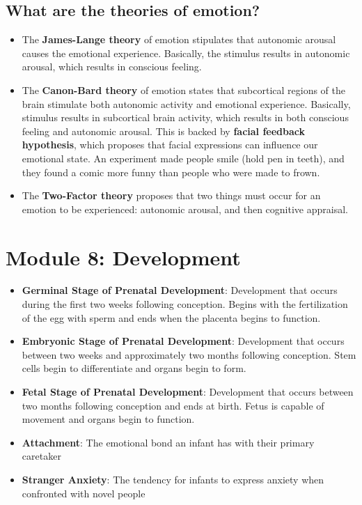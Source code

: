 \documentclass[10pt,letter]{article}
\theoremstyle{plain}
\theoremstyle{definition}
\begin{document}
\subsection*{What are the theories of emotion?}
\begin{itemize}
    \item The \textbf{James-Lange theory} of emotion stipulates that autonomic arousal causes the emotional experience. Basically, the stimulus results in autonomic arousal, which results in conscious feeling.
    \item The \textbf{Canon-Bard theory} of emotion states that subcortical regions of the brain stimulate both autonomic activity and emotional experience. Basically, stimulus results in subcortical brain activity, which results in both conscious feeling and autonomic arousal. This is backed by \textbf{facial feedback hypothesis}, which proposes that facial expressions can influence our emotional state. An experiment made people smile (hold pen in teeth), and they found a comic more funny than people who were made to frown. 
    \item The \textbf{Two-Factor theory} proposes that two things must occur for an emotion to be experienced: autonomic arousal, and then cognitive appraisal. 
\end{itemize}



\section*{Module 8: Development}
\begin{itemize}
    \item \textbf{Germinal Stage of Prenatal Development}: Development that occurs during the first two weeks following conception. Begins with the fertilization of the egg with sperm and ends when the placenta begins to function.
    \item \textbf{Embryonic Stage of Prenatal Development}: Development that occurs between two weeks and approximately two months following conception. Stem cells begin to differentiate and organs begin to form.
    \item \textbf{Fetal Stage of Prenatal Development}: Development that occurs between two months following conception and ends at birth. Fetus is capable of movement and organs begin to function.
    \item \textbf{Attachment}: The emotional bond an infant has with their primary caretaker
    \item \textbf{Stranger Anxiety}: The tendency for infants to express anxiety when confronted with novel people
\end{itemize}
\end{document}
